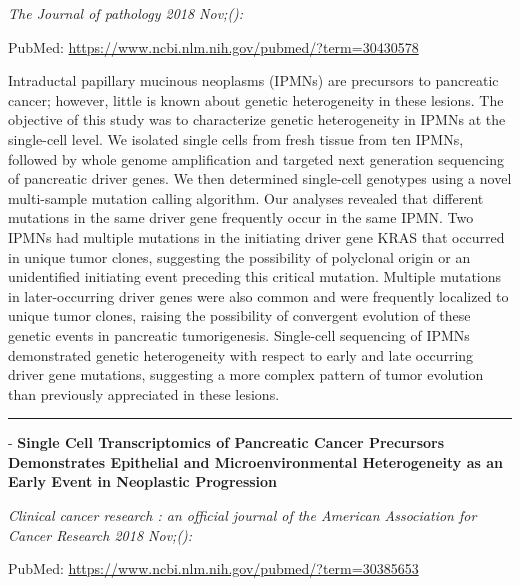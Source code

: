 \documentclass[]{article}
\begin{document}
\emph{The Journal of pathology 2018 Nov;():}

PubMed: \url{https://www.ncbi.nlm.nih.gov/pubmed/?term=30430578}

Intraductal papillary mucinous neoplasms (IPMNs) are precursors to
pancreatic cancer; however, little is known about genetic heterogeneity
in these lesions. The objective of this study was to characterize
genetic heterogeneity in IPMNs at the single-cell level. We isolated
single cells from fresh tissue from ten IPMNs, followed by whole genome
amplification and targeted next generation sequencing of pancreatic
driver genes. We then determined single-cell genotypes using a novel
multi-sample mutation calling algorithm. Our analyses revealed that
different mutations in the same driver gene frequently occur in the same
IPMN. Two IPMNs had multiple mutations in the initiating driver gene
KRAS that occurred in unique tumor clones, suggesting the possibility of
polyclonal origin or an unidentified initiating event preceding this
critical mutation. Multiple mutations in later-occurring driver genes
were also common and were frequently localized to unique tumor clones,
raising the possibility of convergent evolution of these genetic events
in pancreatic tumorigenesis. Single-cell sequencing of IPMNs
demonstrated genetic heterogeneity with respect to early and late
occurring driver gene mutations, suggesting a more complex pattern of
tumor evolution than previously appreciated in these lesions.

{}

{}

\begin{center}\rule{0.5\linewidth}{\linethickness}\end{center}

 - \textbf{Single Cell Transcriptomics of Pancreatic Cancer Precursors
Demonstrates Epithelial and Microenvironmental Heterogeneity as an Early
Event in Neoplastic Progression}

\emph{Clinical cancer research : an official journal of the American
Association for Cancer Research 2018 Nov;():}

PubMed: \url{https://www.ncbi.nlm.nih.gov/pubmed/?term=30385653}
\end{document}
